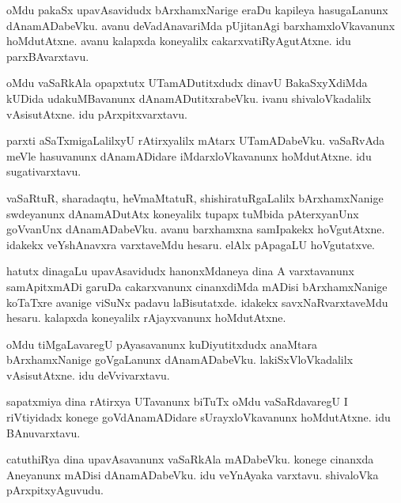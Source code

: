 \documentclass{article}
\begin{document}
\begin{mn}
oMdu  pakaSx  upavAsavidudx  bArxhamxNarige  eraDu  kapileya  hasugaLanunx  dAnamADabeVku.  
avanu  deVadAnavariMda  pUjitanAgi  barxhamxloVkavanunx  hoMdutAtxne.  avanu  kalapxda  
koneyalilx  cakarxvatiRyAgutAtxne.  idu  parxBAvarxtavu.
\end{mn}

\begin{mn}
oMdu  vaSaRkAla  opapxtutx  UTamADutitxdudx  dinavU  BakaSxyXdiMda  kUDida  udakuMBavanunx  
dAnamADutitxrabeVku.  ivanu  shivaloVkadalilx  vAsisutAtxne.  idu  pArxpitxvarxtavu.
\end{mn}

\begin{mn}
parxti  aSaTxmigaLalilxyU  rAtirxyalilx  mAtarx  UTamADabeVku.  vaSaRvAda  meVle  
hasuvanunx  dAnamADidare  iMdarxloVkavanunx  hoMdutAtxne.  idu  sugativarxtavu.
\end{mn}

\begin{mn}
vaSaRtuR,  sharadaqtu,  heVmaMtatuR,  shishiratuRgaLalilx  bArxhamxNanige  swdeyanunx  dAnamADutAtx  
koneyalilx  tupapx  tuMbida  pAterxyanUnx  goVvanUnx  dAnamADabeVku.  avanu  barxhamxna  samIpakekx  
hoVgutAtxne.  idakekx  veYshAnavxra  varxtaveMdu  hesaru.  elAlx  pApagaLU  hoVgutatxve.
\end{mn}

\begin{mn}
hatutx  dinagaLu  upavAsavidudx  hanonxMdaneya  dina  A  varxtavanunx  samApitxmADi  garuDa 
cakarxvanunx  cinanxdiMda  mADisi  bArxhamxNanige  koTaTxre  avanige  viSuNx  padavu  laBisutatxde.  
idakekx  savxNaRvarxtaveMdu  hesaru.  kalapxda  koneyalilx  rAjayxvanunx  hoMdutAtxne.
\end{mn}

\begin{mn}
oMdu  tiMgaLavaregU  pAyasavanunx  kuDiyutitxdudx  anaMtara  bArxhamxNanige  goVgaLanunx  
dAnamADabeVku.  lakiSxVloVkadalilx  vAsisutAtxne.  idu  deVvivarxtavu.
\end{mn}

\begin{mn}
sapatxmiya  dina  rAtirxya  UTavanunx  biTuTx  oMdu  vaSaRdavaregU  I  riVtiyidadx  
konege  goVdAnamADidare  sUrayxloVkavanunx  hoMdutAtxne.  idu  BAnuvarxtavu.
\end{mn}

\begin{mn}
catuthiRya  dina  upavAsavanunx  vaSaRkAla  mADabeVku.  konege  cinanxda  Aneyanunx  
mADisi  dAnamADabeVku.  idu  veYnAyaka  varxtavu.  shivaloVka pArxpitxyAguvudu.
\end{mn}
\end{document}
